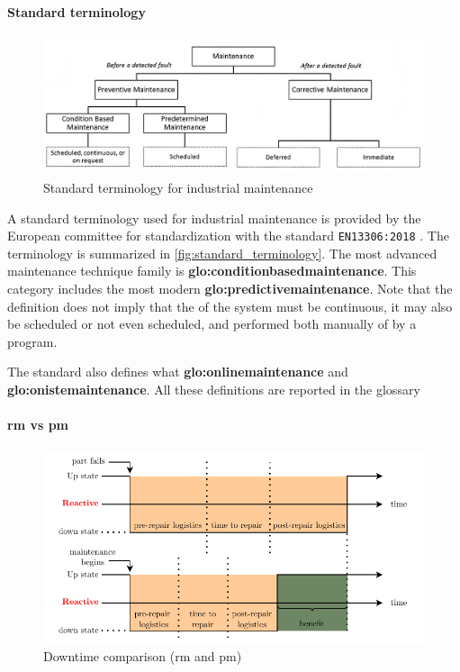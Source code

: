 \paragraph{Standard terminology}
\begin{figure}
    \centering
    \includegraphics[width=\textwidth]{images/StateArt/EN13306.png}
    \caption{Standard terminology for industrial maintenance \cite{rastegari2017condition}}
    \label{fig:standard_terminology}
\end{figure}

A standard terminology used for industrial maintenance is provided by the European committee for standardization with the standard \texttt{EN13306:2018} \cite{EN13306:2018}. The terminology is summarized in \autoref{fig:standard_terminology}. The most advanced maintenance technique family is \textbf{\gls{glo:conditionbasedmaintenance}}. This category includes the most modern \textbf{\gls{glo:predictivemaintenance}}. Note that the definition does not imply that the  of the system must be continuous, it may also be scheduled or not even scheduled, and performed both manually of by a program.

The standard also defines what \textbf{\gls{glo:onlinemaintenance}} and \textbf{\gls{glo:onistemaintenance}}. All these definitions are reported in the {glossary}


\paragraph{\gls{rm} vs \gls{pm}}
\begin{figure}
    \centering
    \includegraphics[scale=0.9]{images/StateArt/lost_opportunities.pdf}
    \caption{Downtime comparison (\gls{rm} and \gls{pm})}
    \label{fig:lost_opportunities}
\end{figure}

